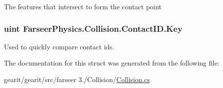 The features that intersect to form the contact point 

\hypertarget{struct_farseer_physics_1_1_collision_1_1_contact_i_d_a6c7336008845a65bdaa5b73e95b9d456}{
\subsubsection[{Key}]{\setlength{\rightskip}{0pt plus 5cm}uint Farseer\+Physics.\+Collision.\+Contact\+I\+D.\+Key}}\label{struct_farseer_physics_1_1_collision_1_1_contact_i_d_a6c7336008845a65bdaa5b73e95b9d456}


Used to quickly compare contact ids. 



The documentation for this struct was generated from the following file\+:\begin{DoxyCompactItemize}
\item 
gearit/gearit/src/farseer 3./\+Collision/\hyperlink{_collision_8cs}{Collision.\+cs}\end{DoxyCompactItemize}
